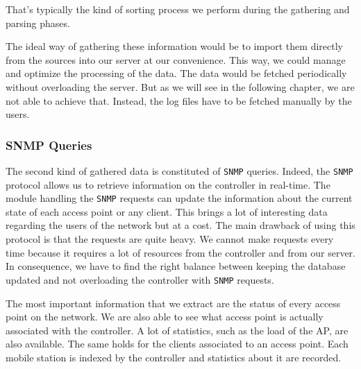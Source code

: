That's typically the kind of sorting process we perform during the gathering and parsing phases.

The ideal way of gathering these information would be to import them directly from the sources into our server at our convenience. This way, we could manage and optimize the processing of the data. The data would be fetched periodically without overloading the server. But as we will see in the following chapter, we are not able to achieve that. Instead, the log files have to be fetched manually by the users.


\subsubsection{SNMP Queries}

The second kind of gathered data is constituted of \texttt{SNMP} queries. Indeed, the \texttt{SNMP} protocol allows us to retrieve information on the controller in real-time. The module handling the \texttt{SNMP} requests can update the information about the current state of each access point or any client. This brings a lot of interesting data regarding the users of the network but at a cost. The main drawback of using this protocol is that the requests are quite heavy. We cannot make requests every time because it requires a lot of resources from the controller and from our server. In consequence, we have to find the right balance between keeping the database updated and not overloading the controller with \texttt{SNMP} requests. 

The most important information that we extract are the status of every access point on the network. We are also able to see what access point is actually associated with the controller. A lot of statistics, such as the load of the AP, are also available. The same holds for the clients associated to an access point. Each mobile station is indexed by the controller and statistics about it are recorded.


